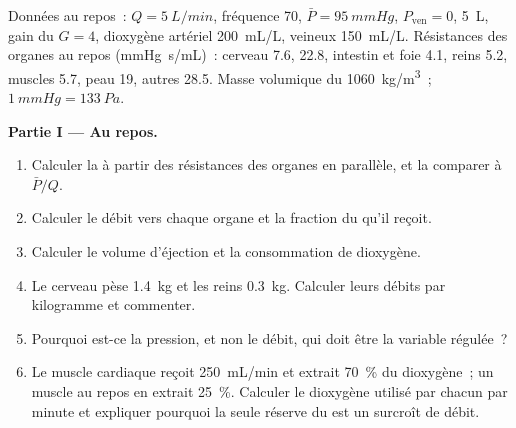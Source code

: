 \begin{problem}
\label{pb:b2:blood-pressure:1}
Données au repos~: $Q = \qty{5}{L/min}$, fréquence 70,
$\bar P = \qty{95}{mmHg}$, $P_{\text{ven}} = 0$,  \qty{5}{L}, gain du
 $G = 4$, dioxygène artériel \qty{200}{mL/L}, veineux
\qty{150}{mL/L}. Résistances des organes au repos (\unit{mmHg.s/mL})~:
cerveau 7.6,  22.8, intestin et foie 4.1, reins 5.2, muscles 5.7,
peau 19, autres 28.5. Masse volumique du  \qty{1060}{kg/m^3}~;
$\qty{1}{mmHg} = \qty{133}{Pa}$.

\medskip
\noindent\textbf{Partie I --- Au repos.}
\begin{enumerate}
  \item Calculer la  à partir des
        résistances des organes en parallèle, et la comparer à
        $\bar P/Q$.
  \item Calculer le débit vers chaque organe et la fraction du  qu'il reçoit.
  \item Calculer le volume d'éjection et la consommation de dioxygène.
  \item Le cerveau pèse \qty{1.4}{kg} et les reins \qty{0.3}{kg}.
        Calculer leurs débits par kilogramme et commenter.
  \item Pourquoi est-ce la pression, et non le débit, qui doit être la
        variable régulée~?
  \item Le muscle cardiaque reçoit \qty{250}{mL/min} et extrait
        \qty{70}{\%} du dioxygène~; un muscle au repos en extrait
        \qty{25}{\%}. Calculer le dioxygène utilisé par chacun par minute
        et expliquer pourquoi la seule réserve du  est un surcroît de
        débit.
\end{enumerate}


\end{problem}
